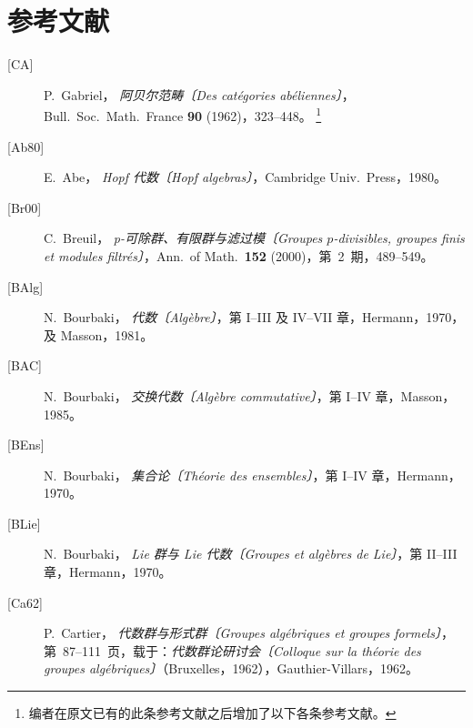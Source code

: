 
\chapter*{参考文献}
\label{sga3:VIIB:bibliography}

\begin{description}
  \item[\textup{[CA]}] P.~Gabriel，
  \emph{阿贝尔范畴〔Des cat\'egories ab\'eliennes〕}，
  Bull.\ Soc.\ Math.\ France \textbf{90} (1962)，323--448。
  \footnote{\label{sga3:VIIB:nde:170}编者在原文已有的此条参考文献之后增加了以下各条参考文献。}

  \item[\textup{[Ab80]}] E.~Abe，
  \emph{Hopf 代数〔Hopf algebras〕}，Cambridge Univ.\ Press，1980。

  \item[\textup{[Br00]}] C.~Breuil，
  \emph{p-可除群、有限群与滤过模〔Groupes \(p\)-divisibles, groupes finis et modules filtr\'es〕}，Ann.\ of Math.\ \textbf{152} (2000)，第~2~期，489--549。

  \item[\textup{[BAlg]}] N.~Bourbaki，
  \emph{代数〔Alg\`ebre〕}，第 I--III 及 IV--VII 章，Hermann，1970，及 Masson，1981。

  \item[\textup{[BAC]}] N.~Bourbaki，
  \emph{交换代数〔Alg\`ebre commutative〕}，第 I--IV 章，Masson，1985。

  \item[\textup{[BEns]}] N.~Bourbaki，
  \emph{集合论〔Th\'eorie des ensembles〕}，第 I--IV 章，Hermann，1970。

  \item[\textup{[BLie]}] N.~Bourbaki，
  \emph{Lie 群与 Lie 代数〔Groupes et alg\`ebres de Lie〕}，第 II--III 章，Hermann，1970。

  \item[\textup{[Ca62]}] P.~Cartier，
  \emph{代数群与形式群〔Groupes alg\'ebriques et groupes formels〕}，第~87--111~页，载于：\emph{代数群论研讨会〔Colloque sur la th\'eorie des groupes alg\'ebriques〕}（Bruxelles，1962），Gauthier-Villars，1962。


\end{description}

